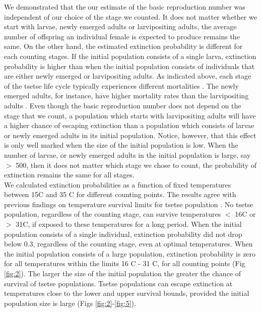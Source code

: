 \documentclass[smallextended]{svjour3}
\begin{document}
We demonstrated that the our estimate of the basic reproduction number was independent of our choice of the stage we counted. It does not matter whether we start with larvae, newly emerged adults or larvipositing adults, the average number of offspring an individual female is expected to produce remains the same. On the other hand, the estimated extinction probability is different for each counting stages. If the initial population consists of a single larva, extinction probability is higher than when the initial population consists of individuals that are either newly emerged or larvipositing adults. As indicated above, each stage of the tsetse life cycle typically experiences different mortalities \cite{Hargrove2005a}. The newly emerged adults, for instance, have higher mortality rates than the larvipositing adults  \cite{Hargrove2019a}. Even though the basic reproduction number does not depend on the stage that we count, a population which starts with larvipositing adults will have a higher chance of escaping extinction than a population which consists of larvae or newly emerged adults in its initial population. Notice, however, that this effect is only well marked when the size of the initial population is low. When the number of larvae, or newly emerged adults in the initial population is large, say $>$ 500, then it does not matter which stage we chose to count, the probability of extinction remains the same for all stages.\\

We calculated extinction probabilities as a function of fixed temperatures between 15\degree C and 35 \degree C for different counting points. The results agree with previous findings on temperature survival limits for tsetse population \cite{Edney1962,Kleynhans2011e,Pagabeleguem2016f,Are2019}. No tsetse population, regardless of the counting stage, can survive temperatures $<$ 16\degree C or $>$ 31\degree C, if exposed to these temperatures for a long period. When the initial population consists of a single individual, extinction probability did not drop below 0.3, regardless of the counting stage, even at optimal temperatures. When the initial population consists of a large population, extinction probability is zero for all temperatures within the limits 16 \degree C - 31 \degree  C, for all counting points (Fig \ref{fig:2}). The larger the size of the initial population the greater the chance of survival of tsetse populations. Tsetse populations can escape extinction at temperatures close to the lower and upper survival bounds, provided the initial population size is large (Figs \ref{fig:2}-\ref{fig:5}).\\
\end{document}

